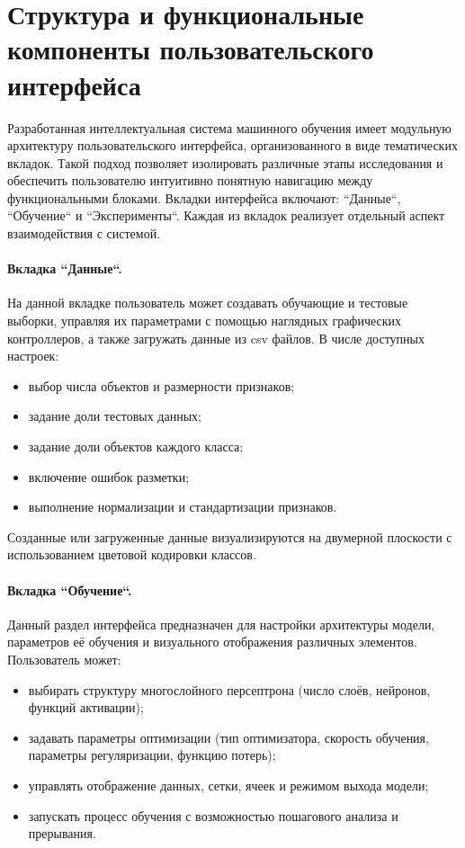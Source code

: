 \section{Структура и функциональные компоненты пользовательского интерфейса}

Разработанная интеллектуальная система машинного обучения имеет модульную архитектуру пользовательского интерфейса, организованного в виде тематических вкладок. Такой подход позволяет изолировать различные этапы исследования и обеспечить пользователю интуитивно понятную навигацию между функциональными блоками. Вкладки интерфейса включают: ``Данные``, ``Обучение`` и ``Эксперименты``. Каждая из вкладок реализует отдельный аспект взаимодействия с системой.

\paragraph{Вкладка ``Данные``.} На данной вкладке пользователь может создавать обучающие и тестовые выборки, управляя их параметрами с помощью наглядных графических контроллеров, а также загружать данные из csv файлов. В числе доступных настроек:
\begin{itemize}
    \item выбор числа объектов и размерности признаков;
    \item задание доли тестовых данных;
    \item задание доли объектов каждого класса;
    \item включение ошибок разметки;
    \item выполнение нормализации и стандартизации признаков.
\end{itemize}

Созданные или загруженные данные визуализируются на двумерной плоскости с использованием цветовой кодировки классов.

\paragraph{Вкладка ``Обучение``.} Данный раздел интерфейса предназначен для настройки архитектуры модели, параметров её обучения и визуального отображения различных элементов. Пользователь может:
\begin{itemize}
    \item выбирать структуру многослойного персептрона (число слоёв, нейронов, функций активации);
    \item задавать параметры оптимизации (тип оптимизатора, скорость обучения, параметры регуляризации, функцию потерь);
    \item управлять отображение данных, сетки, ячеек и режимом выхода модели;
    \item запускать процесс обучения с возможностью пошагового анализа и прерывания.
\end{itemize}

